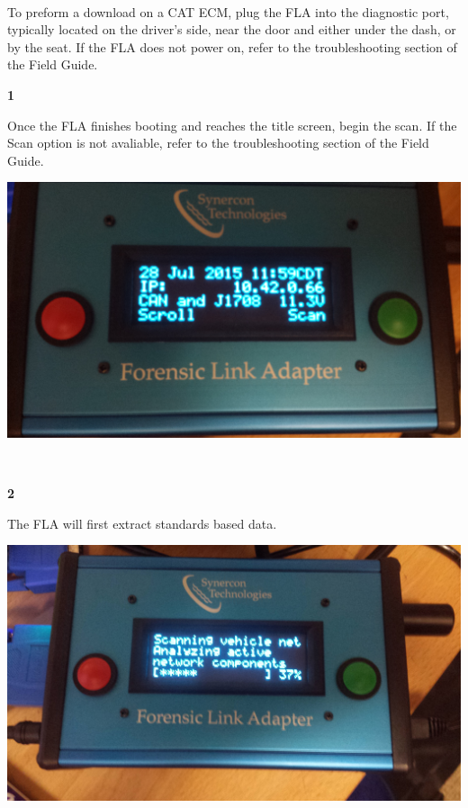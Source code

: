 \documentclass[11pt]{article}
\begin{document}
\paragraph{  }
To preform a download on a CAT ECM, plug the FLA into the diagnostic port, typically located on the driver's side, near the door and either under the dash, or by the seat. If the FLA does not power on, refer to the troubleshooting section of the Field Guide.
\\[\baselineskip]
\noindent\begin{minipage}{0.3\textwidth}%
\begin{center}
\textbf{1}\\[\baselineskip]
\end{center}
Once the FLA finishes booting and reaches the title screen, begin the scan. If the Scan option is not avaliable, refer to the troubleshooting section of the Field Guide.
\end{minipage}%
\hfill%
\begin{minipage}{0.6\textwidth}
\includegraphics[width=\linewidth]{../../media/fla_screens/title_screen}
\end{minipage}
\\[\baselineskip]
\noindent\begin{minipage}{0.3\textwidth}%
\begin{center}
\textbf{2}\\[\baselineskip]
\end{center}
The FLA will first extract standards based data.
\end{minipage}%
\hfill%
\begin{minipage}{0.6\textwidth}
\includegraphics[width=\linewidth]{../../media/fla_screens/scan_1}
\end{minipage}
\end{document}
